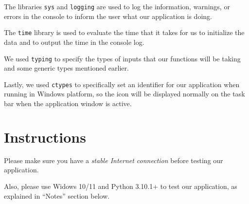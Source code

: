\documentclass[fontsize=11pt]{article}
\begin{document}
    The libraries \verb|sys| and \verb|logging| are used to log the information, warnings, or errors in the console to inform the user what our application is doing. 

    The \verb|time| library is used to evaluate the time that it takes for us to initialize the data and to output the time in the console log.

    We used \verb|typing| to specify the types of inputs that our functions will be taking and some generic types mentioned earlier.

    Lastly, we used \verb|ctypes| to specifically set an identifier for our application when running in Windows platform, so the icon will be displayed normally on the task bar when the application window is active.

    \newpage

    \section{Instructions}

    Please make sure you have a \emph{stable Internet connection} before testing our application.

    Also, please use Widows 10/11 and Python 3.10.1+ to test our application, as explained in ``Notes'' section below.
\end{document}
